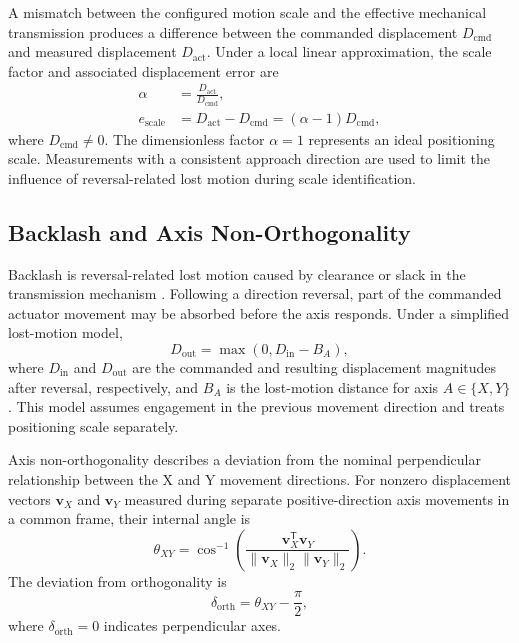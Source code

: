 \documentclass[journal]{IEEEtran}
\begin{document}
A mismatch between the configured motion scale
and the effective mechanical transmission produces
a difference between the commanded displacement
$D_{\mathrm{cmd}}$ and measured displacement
$D_{\mathrm{act}}$. Under a local linear approximation,
the scale factor and associated displacement error are
\begin{equation}
\label{eq:positioning_scale}
\begin{aligned}
\alpha &= \frac{D_{\mathrm{act}}}{D_{\mathrm{cmd}}},\\
e_{\mathrm{scale}}
&=D_{\mathrm{act}}-D_{\mathrm{cmd}}
=(\alpha-1)D_{\mathrm{cmd}},
\end{aligned}
\end{equation}
where $D_{\mathrm{cmd}}\neq0$.
The dimensionless factor $\alpha=1$ represents
an ideal positioning scale.
Measurements with a consistent approach direction
are used to limit the influence of reversal-related
lost motion during scale identification.

\subsection{Backlash and Axis Non-Orthogonality}

Backlash is reversal-related lost motion caused
by clearance or slack in the transmission mechanism
\cite{papageorgiou2019}. Following a direction reversal,
part of the commanded actuator movement may be
absorbed before the axis responds.
Under a simplified lost-motion model,
\begin{equation}
\label{eq:backlash_displacement_model}
D_{\mathrm{out}}
=
\max(0,D_{\mathrm{in}}-B_A),
\end{equation}
where $D_{\mathrm{in}}$ and $D_{\mathrm{out}}$
are the commanded and resulting displacement
magnitudes after reversal, respectively,
and $B_A$ is the lost-motion distance for
axis $A\in\{X,Y\}$.
This model assumes engagement in the previous
movement direction and treats positioning scale
separately.

Axis non-orthogonality describes a deviation from
the nominal perpendicular relationship between
the X and Y movement directions.
For nonzero displacement vectors $\mathbf v_X$
and $\mathbf v_Y$ measured during separate
positive-direction axis movements in a common frame,
their internal angle is
\begin{equation}
\label{eq:axis_internal_angle}
\theta_{XY}
=
\cos^{-1}
\left(
\frac{\mathbf v_X^{\mathsf T}\mathbf v_Y}
{\|\mathbf v_X\|_2\|\mathbf v_Y\|_2}
\right).
\end{equation}
The deviation from orthogonality is
\begin{equation}
\label{eq:axis_nonorthogonality}
\delta_{\mathrm{orth}}
=
\theta_{XY}-\frac{\pi}{2},
\end{equation}
where $\delta_{\mathrm{orth}}=0$ indicates
perpendicular axes.
\end{document}
